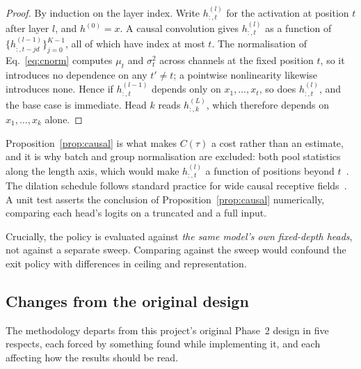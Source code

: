 \documentclass[pdflatex,sn-mathphys-num]{sn-jnl}
\theoremstyle{thmstyleone}%
\theoremstyle{thmstylethree}%
\begin{document}
\begin{proof}
By induction on the layer index. Write $h^{(l)}_{:,t}$ for the activation at
position $t$ after layer $l$, and $h^{(0)} = x$. A causal convolution gives
$h^{(l)}_{:,t}$ as a function of $\{h^{(l-1)}_{:,t-jd}\}_{j=0}^{K-1}$, all of
which have index at most $t$. The normalisation of Eq.~\eqref{eq:cnorm}
computes $\mu_t$ and $\sigma^2_t$ across channels at the fixed position $t$,
so it introduces no dependence on any $t' \ne t$; a pointwise nonlinearity
likewise introduces none. Hence if $h^{(l-1)}_{:,t}$ depends only on
$x_1,\dots,x_t$, so does $h^{(l)}_{:,t}$, and the base case is immediate.
Head $k$ reads $h^{(L)}_{:,k}$, which therefore depends on $x_1,\dots,x_k$
alone.
\end{proof}

\noindent Proposition~\ref{prop:causal} is what makes $C(\tau)$ a cost rather
than an estimate, and it is why batch and group normalisation are excluded:
both pool statistics along the length axis, which would make
$h^{(l)}_{:,t}$ a function of positions beyond $t$~\cite{batchnorm,
layernorm}. The dilation schedule follows standard practice for wide causal
receptive fields~\cite{dilated, wavenet}. A unit test asserts the conclusion
of Proposition~\ref{prop:causal} numerically, comparing each head's logits on
a truncated and a full input.

Crucially, the policy is evaluated against \emph{the same model's own
fixed-depth heads}, not against a separate sweep. Comparing against the sweep
would confound the exit policy with differences in ceiling and representation.

\subsection{Changes from the original design}\label{sec:changes}

The methodology departs from this project's original Phase~2 design in five
respects, each forced by something found while implementing it, and each
affecting how the results should be read.
\end{document}
